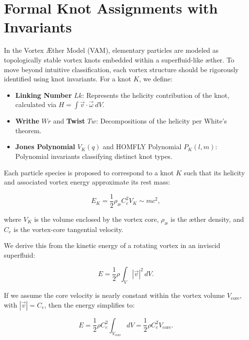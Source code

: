 \section{Formal Knot Assignments with Invariants}

In the Vortex Æther Model (VAM), elementary particles are modeled as topologically stable vortex knots embedded within a superfluid-like æther. To move beyond intuitive classification, each vortex structure should be rigorously identified using knot invariants. For a knot $K$, we define:

\begin{itemize}
    \item \textbf{Linking Number} $Lk$: Represents the helicity contribution of the knot, calculated via $H = \int \vec{v} \cdot \vec{\omega} \ dV$.
    \item \textbf{Writhe} $Wr$ and \textbf{Twist} $Tw$: Decompositions of the helicity per White's theorem.
    \item \textbf{Jones Polynomial} $V_K(q)$ and HOMFLY Polynomial $P_K(l,m)$: Polynomial invariants classifying distinct knot types.
\end{itemize}

Each particle species is proposed to correspond to a knot $K$ such that its helicity and associated vortex energy approximate its rest mass:

\begin{equation}
    E_K = \frac{1}{2} \rho_{\text{\ae}} C_e^2 V_K \sim m c^2,
\end{equation}

where $V_K$ is the volume enclosed by the vortex core, $\rho_{\text{\ae}}$ is the æther density, and $C_e$ is the vortex-core tangential velocity.

We derive this from the kinetic energy of a rotating vortex in an inviscid superfluid:

\begin{equation}
    E = \frac{1}{2} \rho \int_V |\vec{v}|^2 \, dV.
\end{equation}

If we assume the core velocity is nearly constant within the vortex volume $V_{\text{core}}$, with $|\vec{v}| = C_e$, then the energy simplifies to:

\begin{equation}
    E = \frac{1}{2} \rho C_e^2 \int_{V_{\text{core}}} dV = \frac{1}{2} \rho C_e^2 V_{\text{core}}.
\end{equation}

